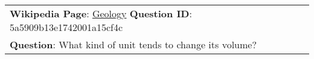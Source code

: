 \begin{figure*}[ht]
{\begin{tabular}{p{}}
            \textbf{Wikipedia Page}: \underline{Geology} \textbf{Question ID}: 5a5909b13e1742001a15cf4c                                                                                                                                                                                                                                                                                                                                                                                                                                                                                                                                                                                                                                                                                                                                                                                                                                                                                                                                                                                                                                                                                                                                                                                                                                                                                                                     \\
            \textbf{Question}: What kind of unit tends to change its volume?                                                                                                                                                                                                                                                                                                                                                                                                                                                                                                                                                                                                                                                                                                                                                                                                                                                                                                                                                                                                                                                                                                                                                                                                                                                                                                                                                \\

\end{tabular}}
\end{figure*}
